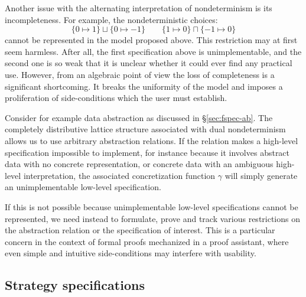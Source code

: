 \documentclass[11pt,oneside]{book}
\theoremstyle{definition}
\begin{document}
Another issue with the alternating interpretation
of nondeterminism is its incompleteness.
For example, the nondeterministic choices:
\[
  \{ 0 \mapsto 1 \} \sqcup \{ 0 \mapsto -1 \}
  \qquad
  \{ 1 \mapsto 0 \} \sqcap \{ -1 \mapsto 0 \}
\]
cannot be represented in the model proposed above.
This restriction may at first seem harmless.
After all,
the first specification above is unimplementable,
and the second one is so weak
that it is unclear whether
it could ever find any practical use.
However,
from an algebraic point of view
the loss of completeness is a significant shortcoming.
It breaks the uniformity of the model
and imposes a proliferation of side-conditions
which the user must establish.

Consider for example
data abstraction as discussed in \S\ref{sec:fspec-ab}.
The completely distributive lattice structure
associated with dual nondeterminism
allows us to use arbitrary abstraction relations.
If the relation makes a high-level specification
impossible to implement,
for instance because it involves abstract data
with no concrete representation,
or concrete data with an ambiguous high-level interpretation,
the associated concretization function $\gamma$
will simply generate an unimplementable
low-level specification.

If this is not possible because
unimplementable low-level specifications cannot be represented,
we need instead to formulate, prove and track various restrictions
on the abstraction relation or the specification of interest.
This is a particular concern in the context of
formal proofs mechanized in a proof assistant,
where even simple and intuitive side-conditions
may interfere with usability.


\subsection{Strategy specifications} \label{sec:strategyspec} %
\end{document}

